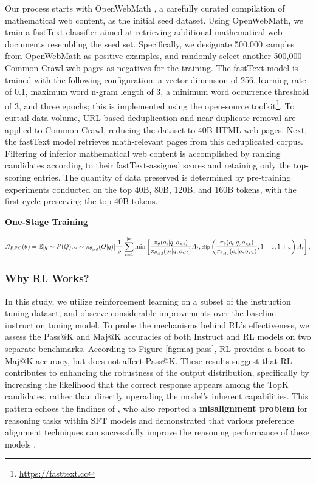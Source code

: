 \begin{itemize}[topsep=0pt]
Our process starts with OpenWebMath \citep{openwebmath}, a carefully curated compilation of mathematical web content, as the initial seed dataset. Using OpenWebMath, we train a fastText classifier \citep{joulin2016fasttext} aimed at retrieving additional mathematical web documents resembling the seed set. Specifically, we designate 500,000 samples from OpenWebMath as positive examples, and randomly select another 500,000 Common Crawl web pages as negatives for the training. The fastText model is trained with the following configuration: a vector dimension of 256, learning rate of 0.1, maximum word n-gram length of 3, a minimum word occurrence threshold of 3, and three epochs; this is implemented using the open-source toolkit\footnote{\url{https://fasttext.cc}}. To curtail data volume, URL-based deduplication and near-duplicate removal are applied to Common Crawl, reducing the dataset to 40B HTML web pages. Next, the fastText model retrieves math-relevant pages from this deduplicated corpus. Filtering of inferior mathematical web content is accomplished by ranking candidates according to their fastText-assigned scores and retaining only the top-scoring entries. The quantity of data preserved is determined by pre-training experiments conducted on the top 40B, 80B, 120B, and 160B tokens, with the first cycle preserving the top 40B tokens.

\textbf{One-Stage Training}

\begin{equation}
\footnotesize
            \mathcal{J}_{PPO}(\theta) = \mathbb{E}{[q \sim P(Q), o \sim \pi_{\theta_{old}}(O|q)]} \frac{1}{|o|} \sum_{t=1}^{|o|} \min \left[ \frac{\pi_\theta(o_{t} | q, o_{<t})}{\pi_{\theta_{old}}(o_{t} | q, o_{<t})} A_{t}, \text{clip} \left( \frac{\pi_\theta(o_{t} | q, o_{<t})}{\pi_{\theta_{old}}(o_{t} | q, o_{<t})}, 1 - \varepsilon, 1 + \varepsilon \right)  A_{t} \right] ,
\end{equation}

\subsubsection{Why RL Works?}  
In this study, we utilize reinforcement learning on a subset of the instruction tuning dataset, and observe considerable improvements over the baseline instruction tuning model. To probe the mechanisms behind RL’s effectiveness, we assess the Pass@K and Maj@K accuracies of both Instruct and RL models on two separate benchmarks. According to Figure \ref{fig:maj-pass}, RL provides a boost to Maj@K accuracy, but does not affect Pass@K. These results suggest that RL contributes to enhancing the robustness of the output distribution, specifically by increasing the likelihood that the correct response appears among the TopK candidates, rather than directly upgrading the model’s inherent capabilities. This pattern echoes the findings of \citep{wang2023making}, who also reported a \textbf{misalignment problem} for reasoning tasks within SFT models and demonstrated that various preference alignment techniques can successfully improve the reasoning performance of these models \citep{yuan2023rrhf,song2023preference,wang2023making}.


\end{itemize}
